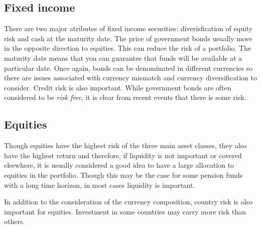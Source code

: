 \documentclass[12pt, a4paper, oneside]{article}\usepackage{graphicx, color}
\begin{document}
\subsection{Fixed income}
There are two major atributes of fixed income securities:  diverisfication of equity risk and cash at the maturity date. The price of government bonds usually move in the opposite direction to equities.  This can reduce the risk of a portfolio.  The maturity date means that you can guarantee that funds will be available at a particular date.  Once again, bonds can be denominated in different currencies so there are issues associated with currency mismatch and currency diversification to consider.  Credit risk is also important.  While government bonds are often considered to be \emph{risk free}, it is clear from recent events that there is some risk. 

\subsection{Equities}
Though equities have the highest risk of the three main asset classes, they also have the highest return and therefore, if liquidity is not important or covered elsewhere, it is usually considered a good idea to have a large allocation to equities in the portfolio.  Though this may be the case for some pension funds with a long time horizon, in most cases liquidity is important.  

In addition to the consideration of the currency composition, country risk is also important for equities.  Investment in some countries may carry more risk than others.  
\end{document}
